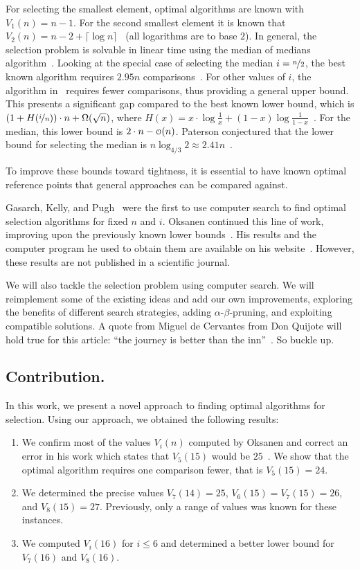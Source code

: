 \documentclass[a4paper,UKenglish,cleveref, autoref, thm-restate]{lipics-v2021}
\newcommand\smallO{
\mathchoice
{{\scriptstyle\mathcal{O}}}%
{{\scriptstyle\mathcal{O}}}%
{{\scriptscriptstyle\mathcal{O}}}%
{\scalebox{.50}{$\scriptscriptstyle\mathcal{O}$}}%
}
\begin{document}
For selecting the smallest element, optimal algorithms are known with $V_1(n) = n - 1$.
For the second smallest element it is known that $V_2(n) = n - 2 + \lceil \log n\rceil$~\cite{Knuth1973} (all logarithms are to base $2$).
In general, the selection problem is solvable in linear time using the median of medians algorithm~\cite{Blum1972}.
Looking at the special case of selecting the median $i = \nicefrac{n}{2}$, the best known algorithm requires $2.95n$ comparisons~\cite{dor1999selecting}.
For other values of $i$, the algorithm in~\cite{dor1999selecting} requires fewer comparisons, thus providing a general upper bound.
This presents a significant gap compared to the best known lower bound, which is $\left (1 + H(\nicefrac{i}{n}) \right ) \cdot n + \Omega(\sqrt n)$, where $H(x) = x \cdot \log \frac{1}{x} + (1 - x) \log \frac{1}{1 - x}$~\cite{bent1985finding}.
For the median, this lower bound is $2 \cdot n - \smallO(n)$.
Paterson conjectured that the lower bound for selecting the median is $n \log_{4/3} 2 \approx 2.41n$~\cite{paterson1996progress}.

To improve these bounds toward tightness, it is essential to have known optimal reference points that general approaches can be compared against.

Gasarch, Kelly, and Pugh~\cite{Gasarch1996} were the first to use computer search to find optimal selection algorithms for fixed $n$ and $i$.
Oksanen continued this line of work, improving upon the previously known lower bounds~\cite{Oksanen2006}.
His results and the computer program he used to obtain them are available on his website~\cite{Oksanen}.
However, these results are not published in a scientific journal.

We will also tackle the selection problem using computer search.
We will reimplement some of the existing ideas and add our own improvements, exploring the benefits of different search strategies, adding $\alpha$-$\beta$-pruning, and exploiting compatible solutions.
A quote from Miguel de Cervantes from Don Quijote will hold true for this article: ``the journey is better than the inn''~\cite{cervantes_don_quijote}.
So buckle up.

\subsection{Contribution.}
In this work, we present a novel approach to finding optimal algorithms for selection.
Using our approach, we obtained the following results:
\begin{enumerate}
  \item We confirm most of the values $V_i(n)$ computed by Oksanen and correct an error in his work which states that $V_5(15)$ would be $25$~\cite{Oksanen}.
        We show that the optimal algorithm requires one comparison fewer, that is $V_5(15) = 24$.
  \item We determined the precise values $V_7(14) = 25$, $V_6(15) = V_7(15) = 26$, and $V_8(15) = 27$.
        Previously, only a range of values was known for these instances.
  \item We computed $V_i(16)$ for $i \leq 6$ and determined a better lower bound for $V_7(16)$ and $V_8(16)$.
\end{enumerate}
\end{document}
